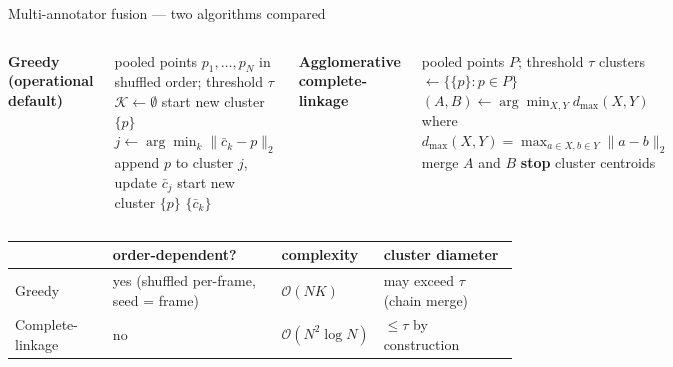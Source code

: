 \documentclass[10pt,aspectratio=169]{beamer}
\begin{document}
\begin{frame}{Multi-annotator fusion --- two algorithms compared}
  \begin{columns}[T]
    \textbf{Greedy (operational default)}
    \scriptsize
    \begin{algorithmic}[1]
      \REQUIRE pooled points $p_1, \dots, p_N$ in shuffled order; threshold $\tau$
      \STATE $\mathcal{K} \gets \emptyset$
          \STATE start new cluster $\{p\}$
        \ELSE
          \STATE $j \gets \arg\min_{k} \| \bar{c}_k - p \|_2$
            \STATE append $p$ to cluster $j$, update $\bar{c}_j$
          \ELSE
            \STATE start new cluster $\{p\}$
          \ENDIF
        \ENDIF
      \ENDFOR
      \RETURN $\{\bar{c}_k\}$
    \end{algorithmic}
    \normalsize

    \textbf{Agglomerative complete-linkage}
    \scriptsize
    \begin{algorithmic}[1]
      \REQUIRE pooled points $P$; threshold $\tau$
      \STATE clusters $\gets \{\{p\} : p \in P\}$ 
      \LOOP
        \STATE $(A, B) \gets \arg\min_{X, Y} d_{\max}(X, Y)$
        \STATE \hspace{4mm} where $d_{\max}(X,Y) = \max_{a \in X, b \in Y} \|a-b\|_2$
          \STATE merge $A$ and $B$
        \ELSE
          \STATE \textbf{stop}
        \ENDIF
      \ENDLOOP
      \RETURN cluster centroids
    \end{algorithmic}
    \normalsize
  \end{columns}

  \vspace{1mm}
  \centering
  \scriptsize
  \begin{tabular}{l l l l}
    \toprule
    & order-dependent? & complexity & cluster diameter \\
    \midrule
    Greedy           & yes (shuffled per-frame, seed = frame) & $\mathcal{O}(NK)$         & may exceed $\tau$ (chain merge) \\
    Complete-linkage & no                                     & $\mathcal{O}(N^2 \log N)$ & $\leq \tau$ by construction      \\
    \bottomrule
  \end{tabular}
\end{frame}
\end{document}

